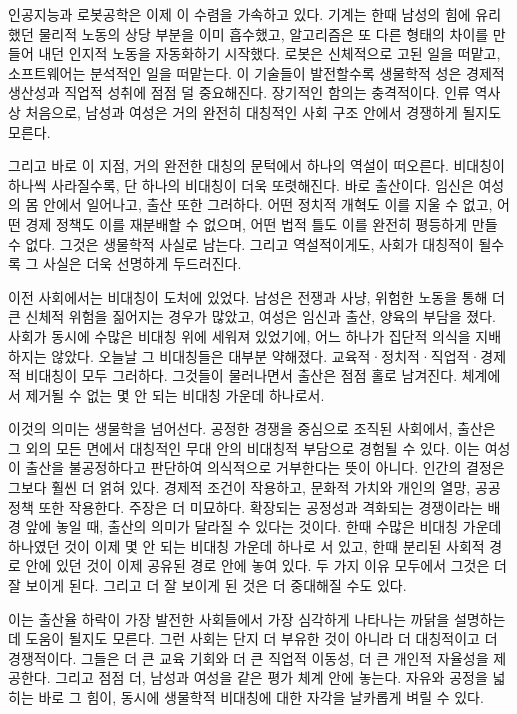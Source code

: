 \documentclass[12pt]{article}
\begin{document}
인공지능과 로봇공학은 이제 이 수렴을 가속하고 있다. 기계는 한때 남성의 힘에 유리했던 물리적 노동의 상당 부분을 이미 흡수했고, 알고리즘은 또 다른 형태의 차이를 만들어 내던 인지적 노동을 자동화하기 시작했다. 로봇은 신체적으로 고된 일을 떠맡고, 소프트웨어는 분석적인 일을 떠맡는다. 이 기술들이 발전할수록 생물학적 성은 경제적 생산성과 직업적 성취에 점점 덜 중요해진다. 장기적인 함의는 충격적이다. 인류 역사상 처음으로, 남성과 여성은 거의 완전히 대칭적인 사회 구조 안에서 경쟁하게 될지도 모른다.

그리고 바로 이 지점, 거의 완전한 대칭의 문턱에서 하나의 역설이 떠오른다. 비대칭이 하나씩 사라질수록, 단 하나의 비대칭이 더욱 또렷해진다. 바로 출산이다. 임신은 여성의 몸 안에서 일어나고, 출산 또한 그러하다. 어떤 정치적 개혁도 이를 지울 수 없고, 어떤 경제 정책도 이를 재분배할 수 없으며, 어떤 법적 틀도 이를 완전히 평등하게 만들 수 없다. 그것은 생물학적 사실로 남는다. 그리고 역설적이게도, 사회가 대칭적이 될수록 그 사실은 더욱 선명하게 두드러진다.

이전 사회에서는 비대칭이 도처에 있었다. 남성은 전쟁과 사냥, 위험한 노동을 통해 더 큰 신체적 위험을 짊어지는 경우가 많았고, 여성은 임신과 출산, 양육의 부담을 졌다. 사회가 동시에 수많은 비대칭 위에 세워져 있었기에, 어느 하나가 집단적 의식을 지배하지는 않았다. 오늘날 그 비대칭들은 대부분 약해졌다. 교육적·정치적·직업적·경제적 비대칭이 모두 그러하다. 그것들이 물러나면서 출산은 점점 홀로 남겨진다. 체계에서 제거될 수 없는 몇 안 되는 비대칭 가운데 하나로서.

이것의 의미는 생물학을 넘어선다. 공정한 경쟁을 중심으로 조직된 사회에서, 출산은 그 외의 모든 면에서 대칭적인 무대 안의 비대칭적 부담으로 경험될 수 있다. 이는 여성이 출산을 불공정하다고 판단하여 의식적으로 거부한다는 뜻이 아니다. 인간의 결정은 그보다 훨씬 더 얽혀 있다. 경제적 조건이 작용하고, 문화적 가치와 개인의 열망, 공공 정책 또한 작용한다. 주장은 더 미묘하다. 확장되는 공정성과 격화되는 경쟁이라는 배경 앞에 놓일 때, 출산의 의미가 달라질 수 있다는 것이다. 한때 수많은 비대칭 가운데 하나였던 것이 이제 몇 안 되는 비대칭 가운데 하나로 서 있고, 한때 분리된 사회적 경로 안에 있던 것이 이제 공유된 경로 안에 놓여 있다. 두 가지 이유 모두에서 그것은 더 잘 보이게 된다. 그리고 더 잘 보이게 된 것은 더 중대해질 수도 있다.

이는 출산율 하락이 가장 발전한 사회들에서 가장 심각하게 나타나는 까닭을 설명하는 데 도움이 될지도 모른다. 그런 사회는 단지 더 부유한 것이 아니라 더 대칭적이고 더 경쟁적이다. 그들은 더 큰 교육 기회와 더 큰 직업적 이동성, 더 큰 개인적 자율성을 제공한다. 그리고 점점 더, 남성과 여성을 같은 평가 체계 안에 놓는다. 자유와 공정을 넓히는 바로 그 힘이, 동시에 생물학적 비대칭에 대한 자각을 날카롭게 벼릴 수 있다.
\end{document}
